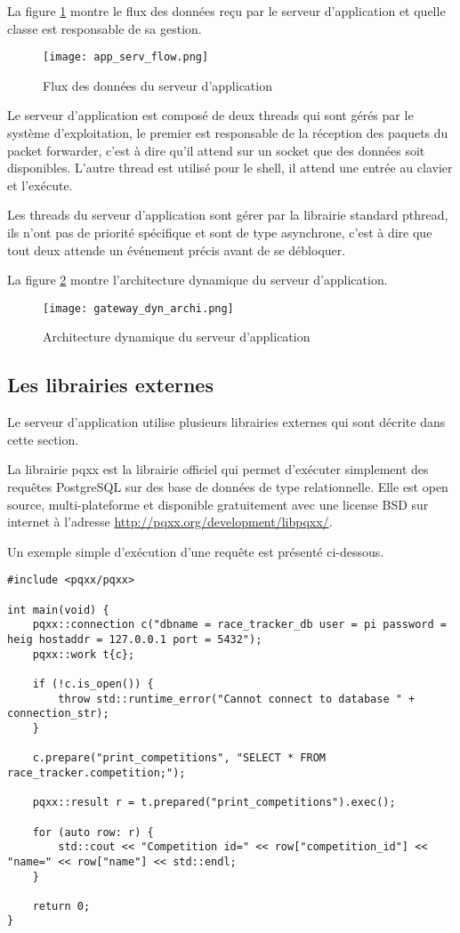 La figure \ref{fig:app_serv_flow} montre le flux des données reçu par le serveur d'application et quelle classe est responsable de sa gestion.

\begin{figure}[htb]
\centering 
\texttt{[image: app\_serv\_flow.png]} 
\caption{Flux des données du serveur d'application}
\label{fig:app_serv_flow}
\end{figure}

Le serveur d'application est composé de deux threads qui sont gérés par le système d'exploitation, le premier est responsable de la réception des paquets du packet forwarder, c'est à dire qu'il attend sur un socket que des données soit disponibles. L'autre thread est utilisé pour le shell, il attend une entrée au clavier et l'exécute.

Les threads du serveur d'application sont gérer par la librairie standard pthread, ils n'ont pas de priorité spécifique et sont de type asynchrone, c'est à dire que tout deux attende un événement précis avant de se débloquer.

La figure \ref{fig:gateway_dyn_archi} montre l'architecture dynamique du serveur d'application. 

\begin{figure}[htb]
\centering 
\texttt{[image: gateway\_dyn\_archi.png]} 
\caption{Architecture dynamique du serveur d'application}
\label{fig:gateway_dyn_archi}
\end{figure}

\subsection{Les librairies externes}

Le serveur d'application utilise plusieurs librairies externes qui sont décrite dans cette section.

La librairie pqxx est la librairie officiel qui permet d'exécuter simplement des requêtes PostgreSQL sur des base de données de type relationnelle. Elle est open source, multi-plateforme et disponible gratuitement avec une license BSD sur internet à l'adresse \url{http://pqxx.org/development/libpqxx/}.

Un exemple simple d'exécution d'une requête est présenté ci-dessous.

\begin{lstlisting}[style=CStyle]
#include <pqxx/pqxx>

int main(void) {
	pqxx::connection c("dbname = race_tracker_db user = pi password = heig hostaddr = 127.0.0.1 port = 5432");
	pqxx::work t{c};

	if (!c.is_open()) {
		throw std::runtime_error("Cannot connect to database " + connection_str);
	}

	c.prepare("print_competitions", "SELECT * FROM race_tracker.competition;");

	pqxx::result r = t.prepared("print_competitions").exec();
	
	for (auto row: r) {
		std::cout << "Competition id=" << row["competition_id"] << "name=" << row["name"] << std::endl;
	}

	return 0;
}
\end{lstlisting}

